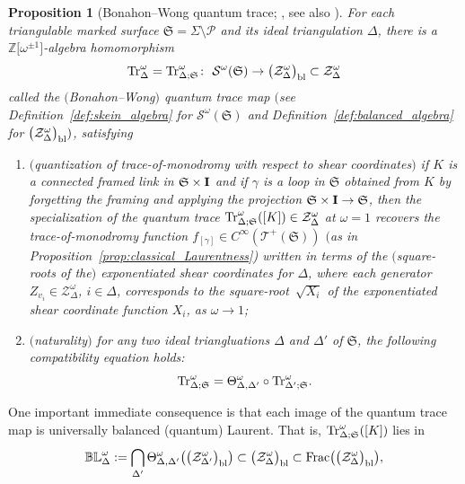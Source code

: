 \documentclass[10pt,a4paper]{amsart}
\numberwithin{equation}{section}
\newtheorem{Proposition}[Theorem]{Proposition}
\theoremstyle{definition}
\begin{document}
\begin{Proposition}[Bonahon--Wong quantum trace; \cite{BW}, see also \cite{Le19}]
\label{prop:BW}
For each triangulable marked surface $\mathfrak{S} = \Sigma\setminus\mathcal{P}$ and its ideal triangulation $\Delta$, there is a $\mathbb{Z}\bigl[\omega^{\pm 1}\bigr]$-algebra homomorphism
\[
{\rm Tr}^\omega_\Delta = {\rm Tr}^\omega_{\Delta;\mathfrak{S}} \colon \ \mathcal{S}^\omega(\mathfrak{S}) \to \bigl(\mathcal{Z}^\omega_\Delta\bigr)_{\rm bl} \subset \mathcal{Z}^\omega_\Delta
\]
called the {\em $($Bonahon--Wong$)$ quantum trace} map $($see Definition~{\rm \ref{def:skein_algebra}} for $\mathcal{S}^\omega(\mathfrak{S})$ and Definition~{\rm \ref{def:balanced_algebra}} for $\bigl(\mathcal{Z}^\omega_\Delta\bigr)_{\rm bl})$, satisfying
\begin{enumerate}[label={\rm (QT\arabic*)}]\itemsep=0pt\setlength{\leftskip}{0.30cm}
\item\label{QT1} $($quantization of trace-of-monodromy with respect to shear coordinates$)$ if $K$ is a connected framed link in $\mathfrak{S} \times {\bf I}$ and if $\gamma$ is a loop in $\mathfrak{S}$ obtained from $K$ by forgetting the framing and applying the projection $\mathfrak{S} \times {\bf I} \to \mathfrak{S}$, then the specialization of the quantum trace ${\rm Tr}^\omega_{\Delta;\mathfrak{S}}([K]) \in \mathcal{Z}^\omega_\Delta$ at $\omega=1$ recovers the trace-of-monodromy function $f_{[\gamma]} \in C^\infty(\mathscr{T}^+(\mathfrak{S}))$ $($as in Proposition~{\rm \ref{prop:classical_Laurentness})} written in terms of the $($square-roots of the$)$ exponentiated shear coordinates for $\Delta$, where each generator $Z_{v_i} \in \mathcal{Z}^\omega_\Delta$, $i\in \Delta$, corresponds to the square-root~$\sqrt{X_i}$ of the exponentiated shear coordinate function $X_i$, as $\omega \to 1$;
\item\label{QT2} $($naturality$)$ for any two ideal triangluations $\Delta$ and $\Delta'$ of $\mathfrak{S}$, the following compatibility equation holds:
\[
{\rm Tr}^\omega_{\Delta;\mathfrak{S}} = \Theta^\omega_{\Delta,\Delta'} \circ {\rm Tr}^\omega_{\Delta';\mathfrak{S}}.
\]
\end{enumerate}
\end{Proposition}
One important immediate consequence is that each image of the quantum trace map is universally balanced (quantum) Laurent. That is, ${\rm Tr}^\omega_{\Delta;\mathfrak{S}}([K])$ lies in
\begin{align*}
\mathbb{BL}^\omega_\Delta := \bigcap_{\Delta'} \Theta^\omega_{\Delta,\Delta'}\bigl( \bigl(\mathcal{Z}^\omega_{\Delta'}\bigr)_{\rm bl} \bigr) \subset \bigl(\mathcal{Z}^\omega_\Delta\bigr)_{\rm bl} \subset {\rm Frac}\bigl( \bigl( \mathcal{Z}^\omega_\Delta\bigr)_{\rm bl} \bigr),
\end{align*}
\end{document}
